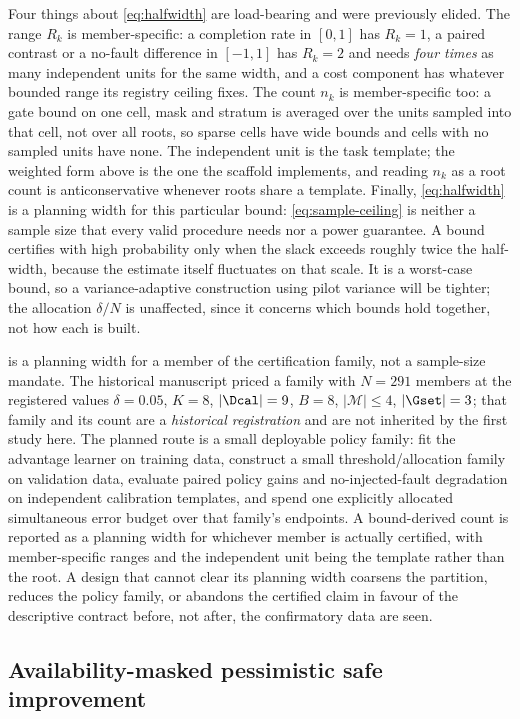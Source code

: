 Four things about \eqref{eq:halfwidth} are load-bearing and were previously
elided.  The range $R_k$ is member-specific: a completion rate in $[0,1]$ has
$R_k=1$, a paired contrast or a no-fault difference in $[-1,1]$ has $R_k=2$ and
needs \emph{four times} as many independent units for the same width, and a
cost component has whatever bounded range its registry ceiling fixes.  The
count $n_k$ is member-specific too: a gate bound on one cell, mask and stratum
is averaged over the units sampled into that cell, not over all roots, so
sparse cells have wide bounds and cells with no sampled units have none.  The
independent unit is the task template; the weighted form above is the one the
scaffold implements, and reading $n_k$ as a root count is anticonservative
whenever roots share a template.  Finally, \eqref{eq:halfwidth} is a planning
width for this particular bound: \eqref{eq:sample-ceiling} is neither a sample
size that every valid procedure needs nor a power guarantee.  A bound certifies
with high probability only when the slack exceeds roughly twice the half-width,
because the estimate itself fluctuates on that scale.  It is a worst-case bound, so a variance-adaptive
construction using pilot variance will be tighter; the allocation $\delta/N$ is
unaffected, since it concerns which bounds hold together, not how each is built.

 is a planning width for a member of the
certification family, not a sample-size mandate.  The historical manuscript
priced a family with $N=291$ members at the registered values $\delta=0.05$,
$K=8$, $|\Dcal|=9$, $B=8$, $|\mathcal M|\le4$, $|\Gset|=3$; that family and its
count are a \emph{historical registration} and are not inherited by the first
study here.  The planned route is a small deployable policy family: fit the
advantage learner on training data, construct a small threshold/allocation family
on validation data, evaluate paired policy gains and no-injected-fault
degradation on independent calibration templates, and spend one explicitly
allocated simultaneous error budget over that family's endpoints.  A
bound-derived count is reported as a planning width for whichever member is
actually certified, with member-specific ranges and the independent unit being
the template rather than the root.  A design that cannot clear its planning
width coarsens the partition, reduces the policy family, or abandons the
certified claim in favour of the descriptive contract before, not after, the
confirmatory data are seen.

\subsection{Availability-masked pessimistic safe improvement}

